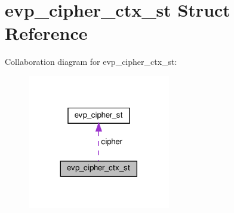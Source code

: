 \hypertarget{structevp__cipher__ctx__st}{}\section{evp\+\_\+cipher\+\_\+ctx\+\_\+st Struct Reference}
\label{structevp__cipher__ctx__st}


Collaboration diagram for evp\+\_\+cipher\+\_\+ctx\+\_\+st\+:
\nopagebreak
\begin{figure}[H]
\begin{center}
\leavevmode
\includegraphics[width=176pt]{structevp__cipher__ctx__st__coll__graph}
\end{center}
\end{figure}
